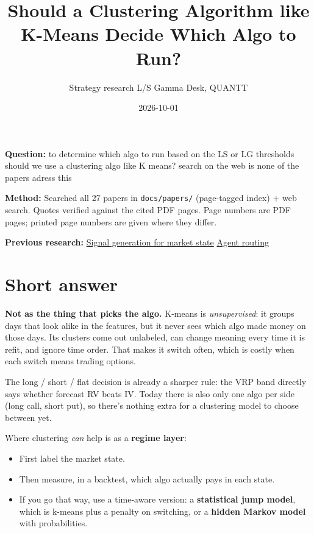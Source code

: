 \documentclass{article}
\title{Should a Clustering Algorithm like K-Means Decide Which Algo to Run?}
\author{Strategy research \textperiodcentered{} L/S Gamma Desk, QUANTT}
\date{2026-10-01}
\begin{document}
\maketitle

\textbf{Question:} to determine which algo to run based on the LS or LG thresholds should we use a clustering algo like K means? search on the web is none of the papers adress this

\textbf{Method:} Searched all 27 papers in \texttt{docs/\allowbreak{}papers/\allowbreak{}} (page-tagged index) + web search. Quotes verified against the cited PDF pages. Page numbers are PDF pages; printed page numbers are given where they differ.

\textbf{Previous research:} \href{2026-09-29-signal-generation-for-market-state.pdf}{Signal generation for market state} \textperiodcentered{} \href{2026-09-27-agent-routing-which-algo-to-run.pdf}{Agent routing}

\section{Short answer}

\textbf{Not as the thing that picks the algo.} K-means is \emph{unsupervised}: it groups days that look alike in the features, but it never sees which algo made money on those days. Its clusters come out unlabeled, can change meaning every time it is refit, and ignore time order. That makes it switch often, which is costly when each switch means trading options.

The long /\allowbreak{} short /\allowbreak{} flat decision is already a sharper rule: the VRP band directly says whether forecast RV beats IV. Today there is also only one algo per side (long call, short put), so there's nothing extra for a clustering model to choose between yet.

Where clustering \emph{can} help is as a \textbf{regime layer}:

\begin{itemize}

\item First label the market state.

\item Then measure, in a backtest, which algo actually pays in each state.

\item If you go that way, use a time-aware version: a \textbf{statistical jump model}, which is k-means plus a penalty on switching, or a \textbf{hidden Markov model} with probabilities.

\end{itemize}
\end{document}
